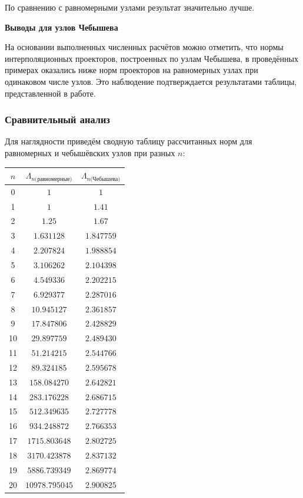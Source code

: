 \documentclass[14pt,openany,a4paper,oneside]{extarticle}
\begin{document}
	По сравнению с равномерными узлами результат значительно лучше.
	
	\newpage
	
	\textbf{Выводы для узлов Чебышева}
	
	На основании выполненных численных расчётов можно отметить, что нормы интерполяционных проекторов, построенных по узлам Чебышева, в проведённых примерах оказались ниже норм проекторов на равномерных узлах при одинаковом числе узлов. Это наблюдение подтверждается результатами таблицы, представленной в работе.
	
	\subsubsection{Сравнительный анализ}
	
	Для наглядности приведём сводную таблицу рассчитанных норм для равномерных и чебышёвских узлов при разных $n$:
	
	\begin{table}[h]
		\begin{center}
			\begin{tabular} {| c | c | c |}
				\hline
				$n$ & $\Lambda_{n\text{(равномерные)}}$ & $\Lambda_{n\text{(Чебышева)}}$\\
				\hline
				0 & $1$ & $1$ \\
				\hline
				1 & $1$ & $1.41$ \\
				\hline
				2 & $1.25$ & $1.67$ \\
				\hline
				3 & $1.631128$ & $1.847759$ \\
				\hline
				4 & $2.207824$ & $1.988854$ \\
				\hline
				5 & $3.106262$ & $2.104398$ \\
				\hline
				6 & $4.549336$ & $2.202215$ \\
				\hline
				7 & $6.929377$ & $2.287016$ \\
				\hline
				8 & $10.945127$ & $2.361857$ \\
				\hline
				9 & $17.847806$ & $2.428829$ \\
				\hline
				10 & $29.897759$ & $2.489430$ \\
				\hline
				11 & $51.214215$ & $2.544766$ \\
				\hline
				12 & $89.324185$ & $2.595678$ \\
				\hline
				13 & $158.084270$ & $2.642821$ \\
				\hline
				14 & $283.176228$ & $2.686715$ \\
				\hline
				15 & $512.349635$ & $2.727778$ \\
				\hline
				16 & $934.248872$ & $2.766353$ \\
				\hline
				17 & $1715.803648$ & $2.802725$ \\
				\hline
				18 & $3170.423878$ & $2.837132$ \\
				\hline
				19 & $5886.739349$ & $2.869774$ \\
				\hline
				20 & $10978.795045$ & $2.900825$ \\
				\hline
			\end{tabular}
		\end{center}
	\end{table}
	
\end{document}
